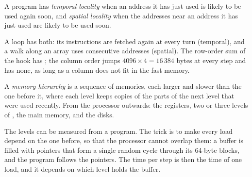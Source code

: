 \begin{definition}\label{def:b2:caches:locality}
A program has \emph{temporal locality} when an address it has just used is likely to be
used again soon, and \emph{spatial locality} when the addresses near an address it has just
used are likely to be used soon.
\end{definition}

A loop has both: its instructions are fetched again at every turn (temporal), and a walk along an array uses
consecutive addresses (spatial). The row-order sum of the hook has ; the column order jumps
$4096 \times 4 = 16\,384$ bytes at every step and has none, as long as a column does not fit in the fast memory.

\begin{definition}\label{def:b2:caches:hierarchy}
A \emph{memory hierarchy} is a sequence of memories, each larger and slower than the one
before it, where each level keeps copies of the parts of the next level that were used recently. From the processor
outwards: the registers, two or three levels of , the main memory, and the disks.
\end{definition}

The levels can be measured from a program. The trick is to make every load depend on the one before, so that the
processor cannot overlap them: a buffer is filled with pointers that form a single random cycle through its 64-byte
blocks, and the program follows the pointers. The time per step is then the time of one load, and it depends on
which level holds the buffer.


\label{out:b2:caches:sweep}

